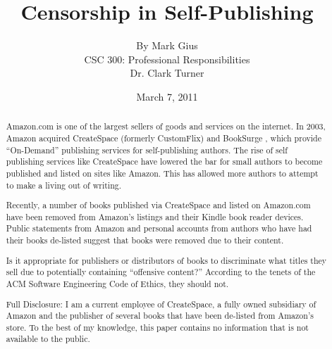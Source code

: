 \documentclass[11pt]{article}
\begin{document}
\title{\vfill Censorship in Self-Publishing}
\author{
By Mark Gius\vspace{10pt} \\ 
CSC 300: Professional Responsibilities\vspace{10pt} \\ 
Dr. Clark Turner\vspace{10pt} \\ 
}
\date{March 7, 2011}

\maketitle

\vfill
\begin{abstract}
Amazon.com is one of the largest sellers of goods and services on the internet.  In 2003, Amazon acquired CreateSpace (formerly CustomFlix) and BookSurge \cite{CustomFlixAcquisition, BookSurgeAcquisition}, which provide ``On-Demand'' publishing services for self-publishing authors. The rise of self publishing services like CreateSpace have lowered the bar for small authors to become published and listed on sites like Amazon. This has allowed more authors to attempt to make a living out of writing.

Recently, a number of books published via CreateSpace and listed on Amazon.com have been removed from Amazon's listings and their Kindle book reader devices.  Public statements from Amazon and personal accounts from authors who have had their books de-listed suggest that books were removed due to their content. 

Is it appropriate for publishers or distributors of books to discriminate what titles they sell due to potentially containing ``offensive content?''  According to the tenets of the ACM Software Engineering Code of Ethics, they should not. 

\vfill

Full Disclosure: I am a current employee of CreateSpace, a fully owned subsidiary of Amazon and the publisher of several books that have been de-listed from Amazon's store. To the best of my knowledge, this paper contains no information that is not available to the public.
\end{abstract}

\thispagestyle{empty} 
\newpage

\thispagestyle{empty}  
\tableofcontents

\newpage
\end{document}
